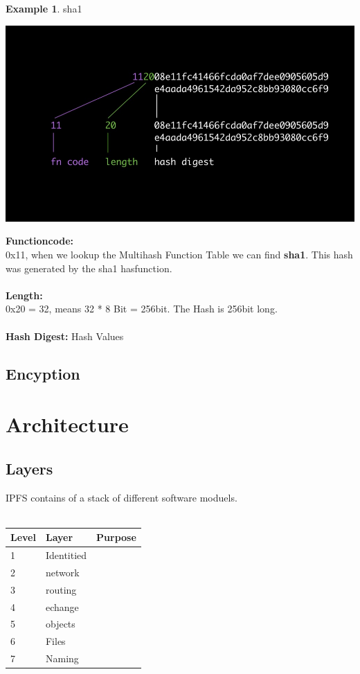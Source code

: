 \documentclass[a4paper,11pt, oneside]{report}
\theoremstyle{definition}
\newtheorem{exmp}{Example}[subsection]
\begin{document}
\begin{exmp} sha1
\begin{center}
	\includegraphics[width=\textwidth]{img/multihash_example.jpg}
\end{center}
\textbf{Functioncode:}\\
0x11, when we lookup the Multihash Function Table we can find \textbf{sha1}. This hash was generated by the sha1 hasfunction.\\ \\
\textbf{Length:}\\
0x20 = 32, means 32 * 8 Bit = 256bit. The Hash is 256bit long.\\ \\
\textbf{Hash Digest:} Hash Values 
\end{exmp}

\section{Encyption}


\newpage

\newpage
 
\chapter{Architecture}
\section{Layers}
IPFS contains of a stack of different software moduels.\\ \\
\noindent
\begin{tabularx}{\textwidth}{XXX}
Level & Layer & Purpose\\ \hline
1 & Identitied & \\ \hline
2 & network &  \\ \hline
3 & routing & \\ \hline
4 & echange &\\ \hline
5 & objects & \\ \hline
6 & Files & \\ \hline
7 & Naming & \\ \hline


\end{tabularx}
\end{document}
